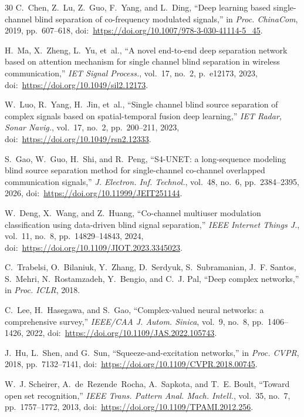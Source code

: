 \documentclass[review,12pt]{elsarticle}
\begin{document}
\begin{thebibliography}{30}
C.~Chen, Z.~Lu, Z.~Guo, F.~Yang, and L.~Ding,
``Deep learning based single-channel blind separation of co-frequency
modulated signals,''
in \emph{Proc. ChinaCom}, 2019, pp.~607--618,
doi:~\url{https://doi.org/10.1007/978-3-030-41114-5_45}.

H.~Ma, X.~Zheng, L.~Yu, et~al.,
``A novel end-to-end deep separation network based on attention
mechanism for single channel blind separation in wireless
communication,''
\emph{IET Signal Process.}, vol.~17, no.~2, p.~e12173, 2023,
doi:~\url{https://doi.org/10.1049/sil2.12173}.

W.~Luo, R.~Yang, H.~Jin, et~al.,
``Single channel blind source separation of complex signals based on
spatial-temporal fusion deep learning,''
\emph{IET Radar, Sonar Navig.}, vol.~17, no.~2, pp.~200--211, 2023,
doi:~\url{https://doi.org/10.1049/rsn2.12333}.

S.~Gao, W.~Guo, H.~Shi, and R.~Peng,
``S4-UNET: a long-sequence modeling blind source separation method for
single-channel co-channel overlapped communication signals,''
\emph{J. Electron. Inf. Technol.}, vol.~48, no.~6, pp.~2384--2395,
2026, doi:~\url{https://doi.org/10.11999/JEIT251144}.

W.~Deng, X.~Wang, and Z.~Huang,
``Co-channel multiuser modulation classification using data-driven blind
signal separation,''
\emph{IEEE Internet Things J.}, vol.~11, no.~8, pp.~14829--14843, 2024,
doi:~\url{https://doi.org/10.1109/JIOT.2023.3345023}.

C.~Trabelsi, O.~Bilaniuk, Y.~Zhang, D.~Serdyuk, S.~Subramanian,
J.~F. Santos, S.~Mehri, N.~Rostamzadeh, Y.~Bengio, and C.~J. Pal,
``Deep complex networks,''
in \emph{Proc. ICLR}, 2018.

C.~Lee, H.~Hasegawa, and S.~Gao,
``Complex-valued neural networks: a comprehensive survey,''
\emph{IEEE/CAA J. Autom. Sinica}, vol.~9, no.~8, pp.~1406--1426, 2022,
doi:~\url{https://doi.org/10.1109/JAS.2022.105743}.

J.~Hu, L.~Shen, and G.~Sun,
``Squeeze-and-excitation networks,''
in \emph{Proc. CVPR}, 2018, pp.~7132--7141,
doi:~\url{https://doi.org/10.1109/CVPR.2018.00745}.

W.~J. Scheirer, A.~de~Rezende~Rocha, A.~Sapkota, and T.~E. Boult,
``Toward open set recognition,''
\emph{IEEE Trans. Pattern Anal. Mach. Intell.}, vol.~35, no.~7,
pp.~1757--1772, 2013, doi:~\url{https://doi.org/10.1109/TPAMI.2012.256}.


\end{thebibliography}
\end{document}
